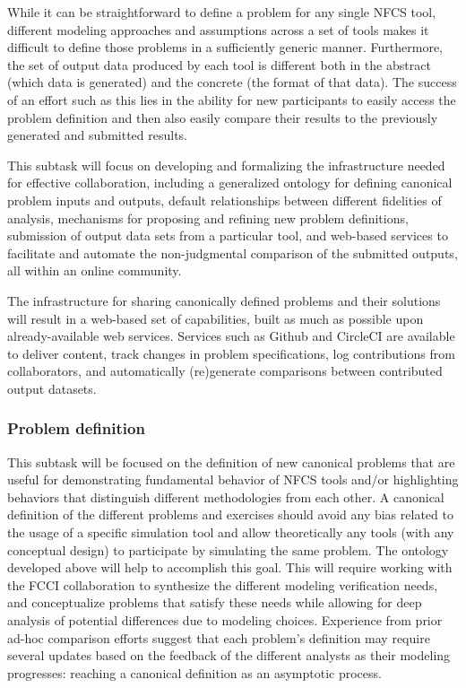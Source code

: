 While it can be straightforward to define a problem for any single \gls{NFCS} tool,
different modeling approaches and assumptions across a set of tools makes it
difficult to define those problems in a sufficiently generic manner.
Furthermore, the set of output data produced by each tool is different both in
the abstract (which data is generated) and the concrete (the format of that
data). The success of an effort such as this lies in the ability for new
participants to easily access the problem definition and then also easily
compare their results to the previously generated and submitted results.

This subtask will focus on developing and formalizing the infrastructure
needed for effective collaboration, including a generalized ontology for
defining canonical problem inputs and outputs, default relationships between
different fidelities of analysis, mechanisms for proposing and refining new
problem definitions, submission of output data sets from a particular tool,
and web-based services to facilitate and automate the non-judgmental
comparison of the submitted outputs\cite{scopatz-non-judgmental}, all within
an online community.

The infrastructure for sharing canonically defined problems and their
solutions will result in a web-based set of capabilities, built as much as
possible upon already-available web services.  Services such as
Github\cite{github} and CircleCI\cite{circleci} are available to deliver
content, track changes in problem specifications, log contributions from
collaborators, and automatically (re)generate comparisons between contributed
output datasets.


\subsubsection{Problem definition} 

This subtask will be focused on the definition of new canonical problems that are
useful for demonstrating fundamental behavior of \gls{NFCS} tools and/or
highlighting behaviors that distinguish different methodologies from each
other. A canonical definition of the different problems and exercises should
avoid any bias related to the usage of a specific simulation tool and allow
theoretically any tools (with any conceptual design) to participate by
simulating the same problem. The ontology developed above will help to
accomplish this goal. This will require working with the \gls{FCCI}
collaboration to synthesize the different modeling verification needs, and
conceptualize problems that satisfy these needs while allowing for deep
analysis of potential differences due to modeling choices.  Experience from
prior ad-hoc comparison efforts suggest that each problem’s definition may
require several updates based on the feedback of the different analysts as
their modeling progresses: reaching a canonical definition as an asymptotic
process.

